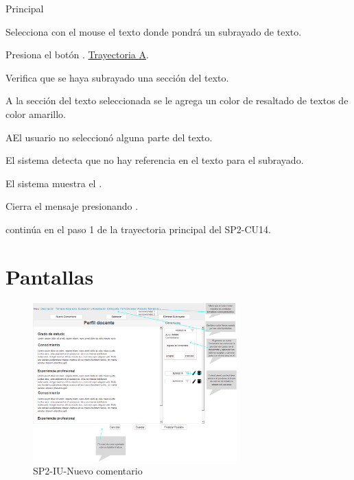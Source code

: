 \begin{UCtrayectoria}{Principal}

    \UCpaso[\UCactor] Selecciona con el mouse el texto donde pondrá un subrayado de texto.

    \UCpaso[\UCactor] Presiona el botón . \hyperref[SP2-CU17-A]{Trayectoria A}. 
    
    \UCpaso Verifica que se haya subrayado una sección del texto. 
    
    \UCpaso A la sección del texto seleccionada se le agrega un color de resaltado de textos de color amarillo.

\end{UCtrayectoria}

\label{SP2-CU17-A}
\begin{UCtrayectoriaA}{A}{El usuario no seleccionó alguna parte del texto.}

	\UCpaso El sistema detecta que no hay referencia en el texto para el subrayado.

  \UCpaso El sistema muestra el .

  \UCpaso[\UCactor] Cierra el mensaje presionando .

  \UCpaso continúa en el paso 1 de la trayectoria principal del SP2-CU14.
\end{UCtrayectoriaA}

\chapter{Pantallas}
 \begin{figure}
  \centering
    \includegraphics[width=0.7\textwidth]{DCU/SP2/Pantallas/Nuevo_comentario}
  \caption{SP2-IU-Nuevo comentario}
  \label{SP2-IU-Nuevo_comentario}
\end{figure}
